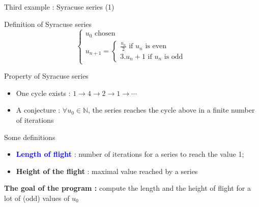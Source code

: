 \documentclass[compress,10pt,aspectratio=169]{beamer}
\begin{document}
\begin{frame}[fragile]{Third example : Syracuse series (1)}
\scriptsize 
\begin{block}{\small Definition of Syracuse series}
    \[
        \left\{
        \begin{array}{l}
            u_{0} \mbox{ chosen} \\
            u_{n+1} = \left\{
                \begin{array}{l}
                    \frac{u_{n}}{2} \mbox{ if } u_{n}\mbox{ is even}\\[1mm]
                    3.u_{n}+1 \mbox{ if } u_{n} \mbox{ is odd}
                \end{array}
            \right.
        \end{array}
        \right.
    \]
\end{block}

\begin{exampleblock}{\small Property of Syracuse series}
    \begin{itemize}
        \item One cycle exists : $1 \rightarrow 4 \rightarrow 2 \rightarrow 1 \rightarrow \cdots$
        \item A conjecture : \alert{$\forall u_{0}\in \mathbb{N}$, 
              the series reaches the cycle above in a finite number of iterations}
    \end{itemize}
\end{exampleblock}

\begin{alertblock}{\small Some definitions}
    \begin{itemize}
        \item \textcolor{blue}{\bf Length of flight} : number of iterations for a series to reach the value 1;
        \item \textcolor{NavyBlue}{\bf Height of the flight} : maximal value reached by a series
    \end{itemize}
\end{alertblock}
\begin{center}{\bf The goal of the program : } compute the length and the height of flight for a lot of 
    (odd) values of $u_{0}$
\end{center}
\end{frame}
\end{document}
